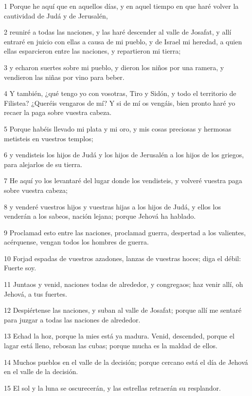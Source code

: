 \par 1 Porque he aquí que en aquellos días, y en aquel tiempo en que haré volver la cautividad de Judá y de Jerusalén,
\par 2 reuniré a todas las naciones, y las haré descender al valle de Josafat, y allí entraré en juicio con ellas a causa de mi pueblo, y de Israel mi heredad, a quien ellas esparcieron entre las naciones, y repartieron mi tierra;
\par 3 y echaron suertes sobre mi pueblo, y dieron los niños por una ramera, y vendieron las niñas por vino para beber.
\par 4 Y también, ¿qué tengo yo con vosotras, Tiro y Sidón, y todo el territorio de Filistea? ¿Queréis vengaros de mí? Y si de mí os vengáis, bien pronto haré yo recaer la paga sobre vuestra cabeza.
\par 5 Porque habéis llevado mi plata y mi oro, y mis cosas preciosas y hermosas metisteis en vuestros templos;
\par 6 y vendisteis los hijos de Judá y los hijos de Jerusalén a los hijos de los griegos, para alejarlos de su tierra.
\par 7 He aquí yo los levantaré del lugar donde los vendisteis, y volveré vuestra paga sobre vuestra cabeza;
\par 8 y venderé vuestros hijos y vuestras hijas a los hijos de Judá, y ellos los venderán a los sabeos, nación lejana; porque Jehová ha hablado.
\par 9 Proclamad esto entre las naciones, proclamad guerra, despertad a los valientes, acérquense, vengan todos los hombres de guerra.
\par 10 Forjad espadas de vuestros azadones, lanzas de vuestras hoces; diga el débil: Fuerte soy.
\par 11 Juntaos y venid, naciones todas de alrededor, y congregaos; haz venir allí, oh Jehová, a tus fuertes.
\par 12 Despiértense las naciones, y suban al valle de Josafat; porque allí me sentaré para juzgar a todas las naciones de alrededor.
\par 13 Echad la hoz, porque la mies está ya madura. Venid, descended, porque el lagar está lleno, rebosan las cubas; porque mucha es la maldad de ellos.
\par 14 Muchos pueblos en el valle de la decisión; porque cercano está el día de Jehová en el valle de la decisión.
\par 15 El sol y la luna se oscurecerán, y las estrellas retraerán su resplandor.

